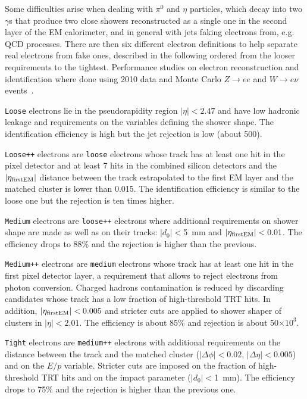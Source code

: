 Some difficulties arise when dealing with $\pi^0$ and $\eta$ particles, which decay into two $\gamma$s
that produce two close showers reconstructed as a single one in the second layer of the EM
calorimeter, and in general with jets faking electrons from, e.g. QCD processes.
There are then six different electron definitions to help separate real electrons from fake ones,
described in the following ordered from the looser requirements to the tightest.
Performance studies on electron reconstruction and identification where done using 2010 data and Monte
Carlo $Z\to ee$ and $W\to e\nu$ events~\cite{eperf}. 

\texttt{Loose} electrons lie in the pseudorapidity region $|\eta| < 2.47$ and have 
low hadronic leakage and requirements on the variables defining the shower shape.
The identification efficiency is high but the jet rejection is low (about 500).

\texttt{Loose++} electrons are \texttt{loose} electrons whose track has at least one hit in 
the pixel detector and at least 7 hits in the combined silicon detectors and the
$|\eta_{\rm first EM}|$ distance between the track estrapolated to the first EM layer and
the matched cluster is lower than 0.015. The identification
efficiency is similar to the loose one but the rejection is ten times higher.

\texttt{Medium} electrons are \texttt{loose++} electrons where additional requirements on shower shape
are made as well as on their tracks: $|d_0|<$5~mm and $|\eta_{\rm first EM}|<0.01$.
The efficiency drops to 88\% and the rejection is
higher than the previous.

\texttt{Medium++} electrons are \texttt{medium} electrons whose track has at least one hit in the
first pixel detector layer, a requirement that allows to reject electrons from
photon conversion. Charged hadrons contamination is reduced by discarding candidates
whose track has a low fraction of high-threshold TRT hits. In addition, $|\eta_{\rm first EM}|<0.005$ 
and stricter cuts are applied to shower shaper of clusters in $|\eta|<2.01$. The
efficiency is about 85\% and rejection is about 50$\times 10^3$.

\texttt{Tight} electrons are \texttt{medium++} electrons with additional requirements on the distance
between the track and the matched cluster ($|\Delta\phi|<0.02$, $|\Delta\eta|<0.005$) and on the $E/p$
variable. Stricter cuts are imposed on the fraction of high-threshold TRT hits and on the impact parameter
($|d_0|<$1~mm). The efficiency drops to 75\% and the rejection is higher than the previous one.


